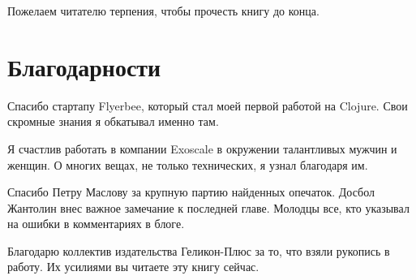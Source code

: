Пожелаем читателю терпения, чтобы прочесть книгу до конца.

\section*{Благодарности}

Спасибо стартапу Flyerbee, который стал моей первой работой на Clojure. Свои
скромные знания я обкатывал именно там.

Я счастлив работать в компании Exoscale в окружении талантливых мужчин и
женщин. О многих вещах, не только технических, я узнал благодаря им.

Спасибо Петру Маслову за крупную партию найденных опечаток. Досбол Жантолин внес
важное замечание к последней главе. Молодцы все, кто указывал на ошибки в
комментариях в блоге.

Благодарю коллектив издательства Геликон-Плюс за то, что взяли рукопись в
работу. Их усилиями вы читаете эту книгу сейчас.
